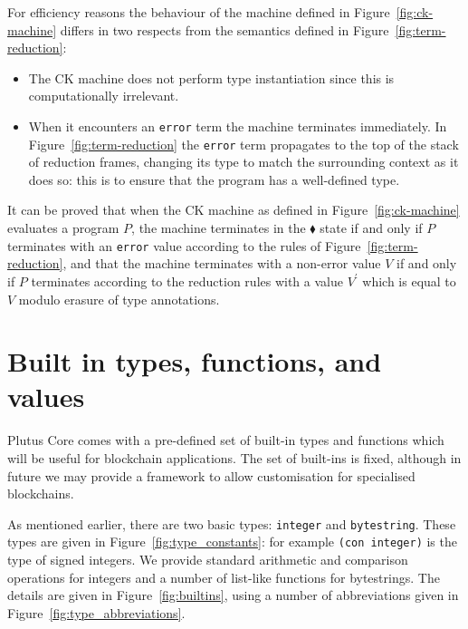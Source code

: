 \documentclass[a4paper]{article}
\begin{document}
For efficiency reasons the behaviour of the machine defined in
Figure~\ref{fig:ck-machine} differs in two respects from the semantics
defined in Figure~\ref{fig:term-reduction}:
\begin{itemize}
\item The CK machine does not perform type instantiation since this
  is computationally irrelevant.
\item When it encounters an \texttt{error} term the machine terminates
  immediately.  In Figure~\ref{fig:term-reduction} the \texttt{error}
  term propagates to the top of the stack of reduction frames,
  changing its type to match the surrounding context as it does so:
  this is to ensure that the program has a well-defined type.
\end{itemize}
\noindent It can be proved that when the CK machine as defined in
Figure~\ref{fig:ck-machine} evaluates a program $P$, the machine
terminates in the $\blacklozenge$ state if and only if $P$ terminates
with an \texttt{error} value according to the rules of
Figure~\ref{fig:term-reduction}, and that the machine terminates with
a non-error value $V$ if and only if $P$ terminates according to the
reduction rules with a value $V^{\prime}$ which is equal to $V$
modulo erasure of type annotations.


\section{Built in types, functions, and values}
\label{sec:builtins}
Plutus Core comes with a pre-defined set of built-in types and
functions which will be useful for blockchain applications.  The set
of built-ins is fixed, although in future we may provide a framework
to allow customisation for specialised blockchains.

As mentioned earlier, there are two basic types: \texttt{integer} and
\texttt{bytestring}.  These types are given in
Figure~\ref{fig:type_constants}: for example \texttt{(con
  integer)} is the type of signed integers.
We provide standard arithmetic and comparison operations for integers
and a number of list-like functions for bytestrings. The details are
given in Figure~\ref{fig:builtins}, using a number of
abbreviations given in Figure~\ref{fig:type_abbreviations}.
\end{document}
